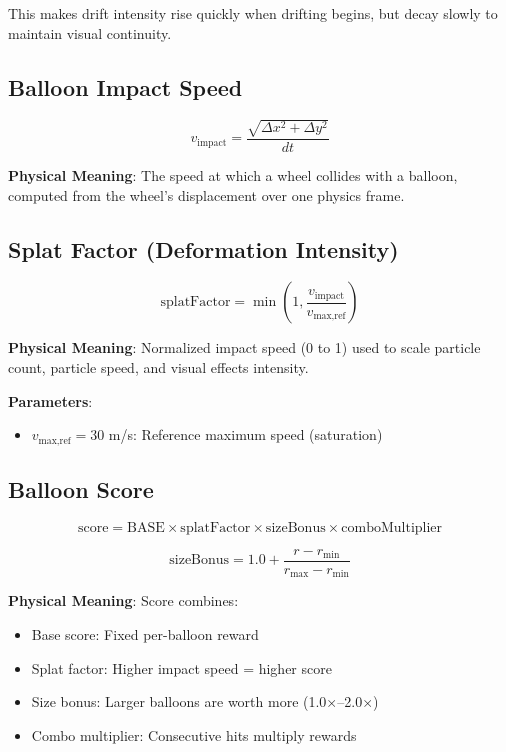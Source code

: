 This makes drift intensity rise quickly when drifting begins, but decay slowly to maintain visual continuity.

\subsection{Balloon Impact Speed}

\begin{equation}
  v_{\text{impact}} = \frac{\sqrt{\Delta x^2 + \Delta y^2}}{dt}
  \label{eq:impact-speed}
\end{equation}

\textbf{Physical Meaning}: The speed at which a wheel collides with a balloon, computed from the wheel's displacement over one physics frame.

\subsection{Splat Factor (Deformation Intensity)}

\begin{equation}
  \text{splatFactor} = \min\left(1, \frac{v_{\text{impact}}}{v_{\text{max,ref}}}\right)
  \label{eq:splat-factor}
\end{equation}

\textbf{Physical Meaning}: Normalized impact speed (0 to 1) used to scale particle count, particle speed, and visual effects intensity.

\textbf{Parameters}:
\begin{itemize}
  \item $v_{\text{max,ref}} = 30$ m/s: Reference maximum speed (saturation)
\end{itemize}

\subsection{Balloon Score}

\begin{equation}
  \text{score} = \mathrm{BASE} \times \text{splatFactor} \times \text{sizeBonus} \times \text{comboMultiplier}
  \label{eq:balloon-score}
\end{equation}

\begin{equation}
  \text{sizeBonus} = 1.0 + \frac{r - r_{\text{min}}}{r_{\text{max}} - r_{\text{min}}}
  \label{eq:size-bonus}
\end{equation}

\textbf{Physical Meaning}: Score combines:
\begin{itemize}
  \item Base score: Fixed per-balloon reward
  \item Splat factor: Higher impact speed = higher score
  \item Size bonus: Larger balloons are worth more (1.0×–2.0×)
  \item Combo multiplier: Consecutive hits multiply rewards
\end{itemize}

